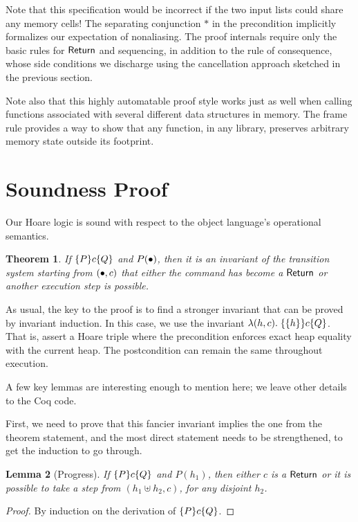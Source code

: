 \documentclass{amsbook}
\newtheorem{theorem}{Theorem}[chapter]
\newtheorem{lemma}[theorem]{Lemma}
\theoremstyle{definition}
\theoremstyle{remark}
\numberwithin{section}{chapter}
\numberwithin{equation}{chapter}
\begin{document}
Note that this specification would be incorrect if the two input lists could share any memory cells!
The separating conjunction $*$ in the precondition implicitly formalizes our expectation of nonaliasing.
The proof internals require only the basic rules for $\mathsf{Return}$ and sequencing, in addition to the rule of consequence, whose side conditions we discharge using the cancellation approach sketched in the previous section.

Note also that this highly automatable proof style works just as well when calling functions associated with several different data structures in memory.
The frame rule provides a way to show that any function, in any library, preserves arbitrary memory state outside its footprint.

\section{Soundness Proof}

Our Hoare logic is sound with respect to the object language's operational semantics.

\invariants
\begin{theorem}
  If $\{P\} c \{Q\}$ and $P(\bullet)$, then it is an invariant of the transition system starting from $(\bullet, c)$ that either the command has become a $\mathsf{Return}$ or another execution step is possible.
\end{theorem}

As usual, the key to the proof is to find a stronger invariant that can be proved by invariant induction.
In this case, we use the invariant $\lambda (h, c). \; \{\{h\}\} c \{Q\}$.
That is, assert a Hoare triple where the precondition enforces exact heap equality with the current heap.
The postcondition can remain the same throughout execution.

A few key lemmas are interesting enough to mention here; we leave other details to the Coq code.

First, we need to prove that this fancier invariant implies the one from the theorem statement, and the most direct statement needs to be strengthened, to get the induction to go through.

\begin{lemma}[Progress]
  If $\{P\} c \{Q\}$ and $P(h_1)$, then either $c$ is a $\mathsf{Return}$ or it is possible to take a step from $(h_1 \uplus h_2, c)$, for any disjoint $h_2$.
\end{lemma}
\begin{proof}
  By induction on the derivation of $\{P\} c \{Q\}$.
\end{proof}
\end{document}

